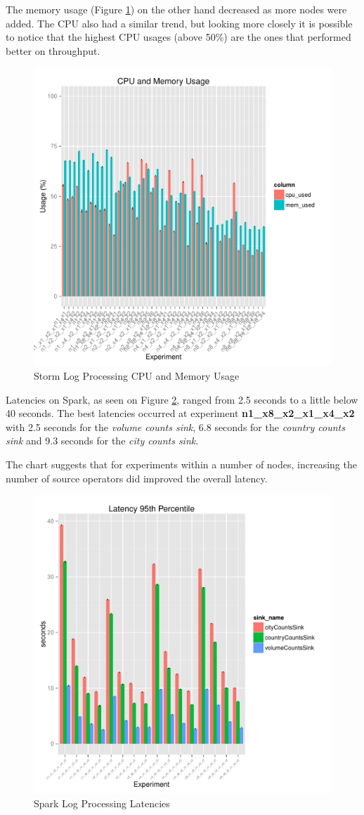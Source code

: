 \documentclass[ppgc,diss,english]{iiufrgs}
\begin{document}
The memory usage (Figure \ref{fig:storm_logprocessing_cpu_mem}) on the other hand decreased as more nodes were added. The CPU also had a similar trend, but looking more closely it is possible to notice that the highest CPU usages (above 50\%) are the ones that performed better on throughput.

\begin{figure}[H]
    \centering
	\includegraphics[width=.6\textwidth]{summaries/storm_logprocessing/full_cpu_mem.pdf}
	\caption{Storm Log Processing CPU and Memory Usage}
	\label{fig:storm_logprocessing_cpu_mem}
\end{figure}

Latencies on Spark, as seen on Figure \ref{fig:spark_logprocessing_latency}, ranged from 2.5 seconds to a little below 40 seconds. The best latencies occurred at experiment \textbf{n1\_x8\_x2\_x1\_x4\_x2} with 2.5 seconds for the \textit{volume counts sink}, 6.8 seconds for the \textit{country counts sink} and 9.3 seconds for the \textit{city counts sink}.

The chart suggests that for experiments within a number of nodes, increasing the number of source operators did improved the overall latency.

\begin{figure}[H]
    \centering
	\includegraphics[width=.6\textwidth]{summaries/spark_logprocessing/latency.pdf}
	\caption{Spark Log Processing Latencies}
	\label{fig:spark_logprocessing_latency}
\end{figure}
\end{document}
